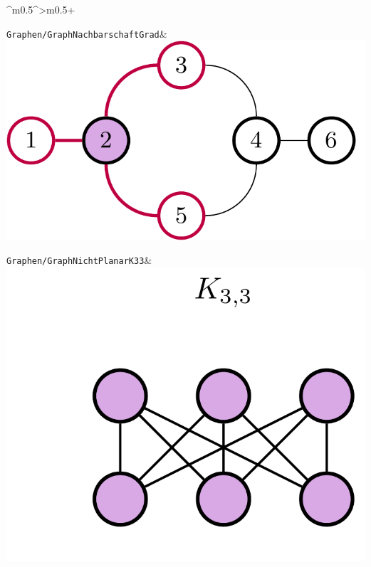 \documentclass[PLAIN]{Lilly}
\begin{document}
\begin{tabularx}{\linewidth}{^m{0.5\linewidth}^>{\centering\arraybackslash}m{0.5\linewidth}+}
\midrule 
{} {}
 {}\verb|Graphen/GraphNachbarschaftGrad|& \includegraphics[width=0.8\linewidth]{Graphen/GraphNachbarschaftGrad-pdf.pdf}\\
\midrule {} {}\verb|Graphen/GraphNichtPlanarK33|& \includegraphics[width=0.8\linewidth]{Graphen/GraphNichtPlanarK33-pdf.pdf}\\

\end{tabularx}
\end{document}
